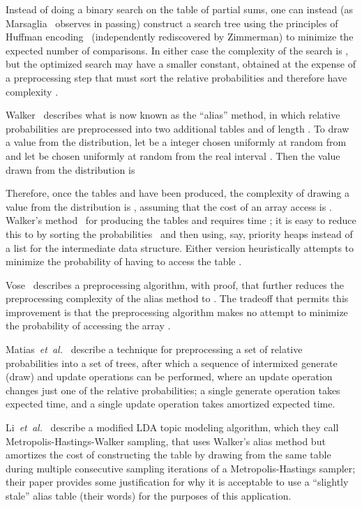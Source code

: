 \documentclass[10pt,nohyperref]{sigplanconf}
\begin{document}
Instead of doing a binary search on the table of partial sums, one can instead (as Marsaglia~\cite{Marsaglia-1963} observes in passing)
construct a search tree using the principles of Huffman encoding~\cite{Huffman-1952} (independently rediscovered
by Zimmerman\cite{Zimmerman-1959}) to minimize the expected number of comparisons.  In either case
the complexity of the search is , but the optimized search may have a smaller constant,
obtained at the expense of a preprocessing step that must sort the relative probabilities and
therefore have complexity .

Walker~\cite{Walker-arbitrary-1974,Walker-TOMS-1977} describes what is now known as the ``alias'' method,
in which  relative probabilities are preprocessed into two additional tables  and  of length .  To draw a value
from the distribution, let  be a integer chosen uniformly at random from 
and let  be chosen uniformly at random from the real interval .  Then the value drawn from the
distribution is

Therefore, once the tables  and  have been produced, the complexity of drawing a value from the distribution is ,
assuming that the cost of an array access is .
Walker's method~\cite{Walker-TOMS-1977} for producing the tables  and  requires time ;
it is easy to reduce this to  by sorting the probabilities~\cite[exercise 3.4.1-7]{KNUTH-VOLUME-2}
and then using, say, priority heaps instead of a list for the intermediate data structure.
Either version heuristically attempts to minimize the probability of having to access the table .

Vose~\cite{Vose-1991} describes a preprocessing algorithm, with proof, that further reduces the preprocessing complexity
of the alias method to .  The tradeoff that permits this improvement is that the preprocessing algorithm makes
no attempt to minimize the probability of accessing the array .

Matias~{\it et~al.}~\cite{Matias-1993} describe a technique for preprocessing a set of relative probabilities into a set of trees,
after which a sequence of intermixed generate (draw) and update operations can be performed, where an update operation changes
just one of the relative probabilities; a single generate operation takes  expected time,
and a single update operation takes  amortized expected time.

Li~{\it et~al.}~\cite{li_reducing_14} describe a modified LDA topic modeling algorithm, which they call
Metropolis-Hastings-Walker sampling, that uses Walker's alias method but amortizes the cost of constructing
the table by drawing from the same table during multiple consecutive sampling iterations of a Metropolis-Hastings sampler;
their paper provides some justification for why it is acceptable to use a ``slightly stale'' alias table (their words)
for the purposes of this application.
\end{document}
